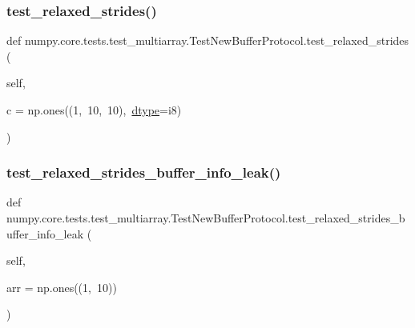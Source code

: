 \subsubsection{\texorpdfstring{test\+\_\+relaxed\+\_\+strides()}{test\_relaxed\_strides()}}
{\footnotesize\ttfamily def numpy.\+core.\+tests.\+test\+\_\+multiarray.\+Test\+New\+Buffer\+Protocol.\+test\+\_\+relaxed\+\_\+strides (\begin{DoxyParamCaption}\item[{}]{self,  }\item[{}]{c = {\ttfamily np.ones((1,~10,~10),~\hyperlink{classnumpy_1_1core_1_1tests_1_1test__multiarray_1_1TestNewBufferProtocol_a3250718656f06991ca9307ea8f73b9eb}{dtype}=\textquotesingle{}i8\textquotesingle{})} }\end{DoxyParamCaption})}

\mbox{\label{classnumpy_1_1core_1_1tests_1_1test__multiarray_1_1TestNewBufferProtocol_aa2a1045db68042ba70905ec73ebbb286}} 
\subsubsection{\texorpdfstring{test\+\_\+relaxed\+\_\+strides\+\_\+buffer\+\_\+info\+\_\+leak()}{test\_relaxed\_strides\_buffer\_info\_leak()}}
{\footnotesize\ttfamily def numpy.\+core.\+tests.\+test\+\_\+multiarray.\+Test\+New\+Buffer\+Protocol.\+test\+\_\+relaxed\+\_\+strides\+\_\+buffer\+\_\+info\+\_\+leak (\begin{DoxyParamCaption}\item[{}]{self,  }\item[{}]{arr = {\ttfamily np.ones((1,~10))} }\end{DoxyParamCaption})}

